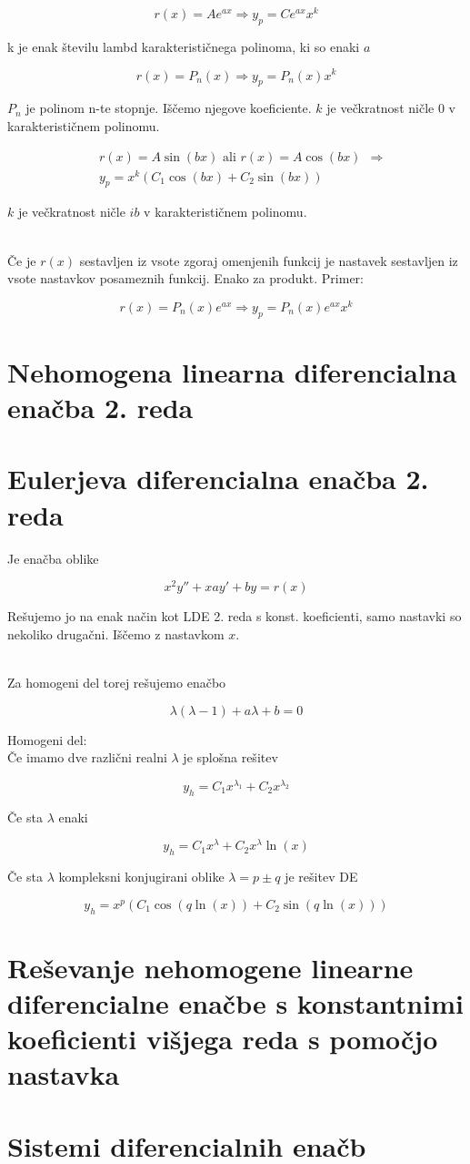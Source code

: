 \documentclass[12pt]{report}
\begin{document}
\[r(x) = Ae^{ax} \Rightarrow y_p = Ce^{ax}x^k\]

k je enak številu lambd karakterističnega polinoma, ki so enaki $a$

\[r(x) = P_n(x) \Rightarrow y_p = P_n(x)x^k\]

$P_n$ je polinom n-te stopnje. Iščemo njegove koeficiente. $k$ je večkratnost ničle 0 v karakterističnem polinomu.



\begin{align*} 
&r(x)=A\sin(bx) \text{ ali } r(x)=A\cos(bx)\ \ \Rightarrow \\ \ &y_p=x^k(C_1\cos(bx)+C_2\sin(bx))
\end{align*} 

$k$ je večkratnost ničle $ib$ v karakterističnem polinomu.\\\ 

Če je $r(x)$ sestavljen iz vsote zgoraj omenjenih funkcij je nastavek sestavljen iz vsote nastavkov posameznih funkcij. Enako za produkt. Primer:

\[r(x) = P_n(x)e^{ax} \Rightarrow y_p = P_n(x)e^{ax}x^k\]


\section*{Nehomogena linearna diferencialna enačba 2. reda}

\section*{Eulerjeva diferencialna enačba 2. reda}

Je enačba oblike

\[
x^2y'' + xay' + by = r(x)
\]

Rešujemo jo na enak način kot LDE 2. reda s konst. koeficienti, samo nastavki so nekoliko drugačni. Iščemo z nastavkom $x$. \\\

Za homogeni del torej rešujemo enačbo

\[\lambda(\lambda -1) +a\lambda + b = 0 \]

Homogeni del:\\
Če imamo dve različni realni $\lambda$ je splošna rešitev

\[y_h = C_1x^{\lambda_1} + C_2x^{\lambda_2}\]

Če sta $\lambda$ enaki

\[y_h = C_1x^{\lambda} + C_2x^{\lambda}\ln(x)\]

Če sta $\lambda$ kompleksni konjugirani oblike $\lambda = p \pm q$ je rešitev DE


\[y_h=x^p(C_1\cos(q\ln(x))+C_2\sin(q\ln(x)))\]


\section*{Reševanje nehomogene linearne diferencialne enačbe s konstantnimi koeficienti višjega reda s pomočjo nastavka}

\section*{Sistemi diferencialnih enačb}
\end{document}

